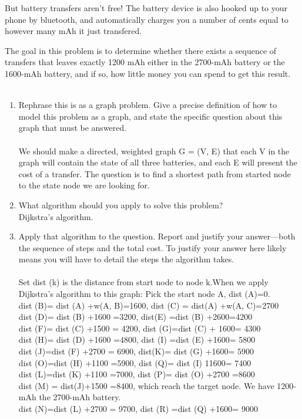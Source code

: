 \documentclass[12pt]{article}
\begin{document}
\begin{enumerate}
But battery transfers aren't free! The battery device is also hooked up to your phone by bluetooth, and automatically charges you a number of cents equal to however many mAh it just transfered. 
	
	The goal in this problem is to determine whether there exists a sequence of transfers that leaves exactly 1200 mAh either in the 2700-mAh battery or the 1600-mAh battery, and if so, how little money you can spend to get this result.
	\\
	\\

	\newpage
	\begin{enumerate}
	
	
	\item \label{4a} Rephrase this is as a graph problem. Give a precise definition of how to model this problem as a graph, and state the specific question about this graph that must be answered.
	\\	
	\\We should make a directed, weighted graph G = (V, E) that each V in the graph will contain the state of all three batteries, and each E will present the cost of a transfer. The question is to find a shortest path from started node to the state node we are looking for.
	\\
	\vspace{3.5in}
	\item \label{4b} What algorithm should you apply to solve this problem?
	\\
	Dijkstra's algorithm.
	
	
	\newpage
	
	\item \label{4c} Apply that algorithm to the question. Report and justify your answer---both the sequence of steps and the total cost. To justify your answer here likely means you will have to detail the steps the algorithm takes.
	\\
	\\
	Set dist (k) is the distance from start node to node k.When we apply Dijkstra's algorithm to this graph:
	Pick the start node A, dist (A)=0.\\
dist (B)= dist (A) +w(A, B)=1600, dist (C) = dist(A) +w(A, C)=2700\\
dist (D)= dist (B) +1600 =3200, dist(E) =dist (B) +2600=4200\\
dist (F)= dist (C) +1500 = 4200, dist (G)=dist (C) + 1600= 4300\\
dist (H)= dist (D) +1600 =4800, dist (I) =dist (E) +1600= 5800\\
dist (J)=dist (F) +2700 = 6900, dist(K)= dist (G) +1600= 5900\\
dist (O)=dist (H) +1100 =5900, dist (Q)= dist (I) 11600= 7400\\
dist (L)=dist (K) +1100 =7000, dist (P)= dist (O) +2700 =8600\\
dist (M) = dist(J)+1500 =8400, which reach the target node. We have 1200-mAh the 2700-mAh battery.\\
dist (N)=dist (L) +2700 = 9700, dist (R) =dist (Q) +1600= 9000\\


\end{enumerate}
\end{enumerate}
\end{document}
